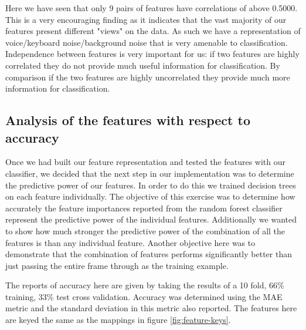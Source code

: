 \documentclass[ %
                    author={Sam Phippen},
                supervisor={Dr. Rafal Bogacz},
                     title={Real time voice activity detectors in noisy personal computing environments},
                  subtitle={},
                    degree={MEng},
                      year={2012} ]{thesis}
\begin{document}
Here we have seen that only 9 pairs of features have correlations of above 0.5000.
This is a very encouraging finding as it indicates that the vast majority of
our features present different "views" on the data. As such we have a
representation of voice/keyboard noise/background noise that is very amenable
to classification. Independence between features is very important for us: if
two features are highly correlated they do not provide much useful information
for classification. By comparison if the two features are highly uncorrelated
they provide much more information for classification.

\subsection{Analysis of the features with respect to accuracy}

Once we had built our feature representation and tested the features with our
classifier, we decided that the next step in our implementation was to
determine the predictive power of our features. In order to do this we trained
decision trees on each feature individually. The objective of this exercise was
to determine how accurately the feature importances reported from the random
forest classifier represent the predictive power of the individual features.
Additionally we wanted to show how much stronger the predictive power of the
combination of all the features is than any individual feature. Another
objective here was to demonstrate that the combination of features performs
significantly better than just passing the entire frame through as the training
example.

The reports of accuracy here are given by taking the results of a 10 fold, 66\%
training, 33\% test cross validation. Accuracy was determined using the MAE
metric and the standard deviation in this metric also reported. The features
here are keyed the same as the mappings in figure \ref{fig:feature-keys}.
\end{document}

